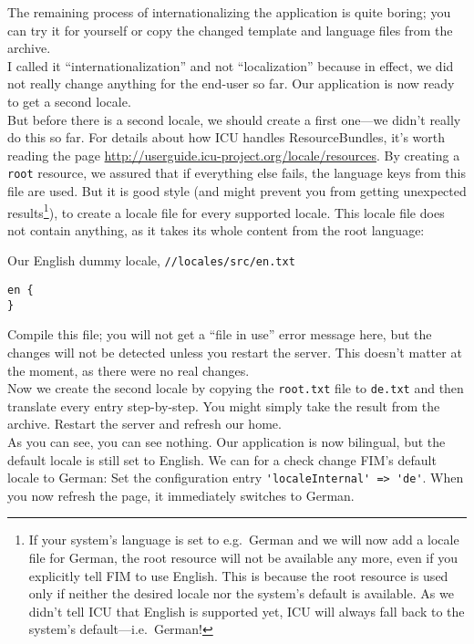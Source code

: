 \documentclass{scrartcl}
\begin{document}
      The remaining process of internationalizing the application is quite boring; you can try it for yourself or copy the changed template and language files from the archive. \\
      I called it ``internationalization'' and not ``localization'' because in effect, we did not really change anything for the end-user so far. Our application is now ready to get a second locale. \\
      But before there is a second locale, we should create a first one---we didn't really do this so far. For details about how ICU handles ResourceBundles, it's worth reading the page \url{http://userguide.icu-project.org/locale/resources}. By creating a \texttt{root} resource, we assured that if everything else fails, the language keys from this file are used. But it is good style (and might prevent you from getting unexpected results\footnote{If your system's language is set to e.g.\ German and we will now add a locale file for German, the root resource will not be available any more, even if you explicitly tell FIM to use English. This is because the root resource is used only if neither the desired locale nor the system's default is available. As we didn't tell ICU that English is supported yet, ICU will always fall back to the system's default---i.e.\ German!}), to create a locale file for every supported locale. This locale file does not contain anything, as it takes its whole content from the root language:
      \begin{listing}[H]
         \caption{Our English dummy locale, \texttt{//locales/src/en.txt}}
         \begin{verbatim}
en {
}
         \end{verbatim}
      \end{listing}
      Compile this file; you will not get a ``file in use'' error message here, but the changes will not be detected unless you restart the server. This doesn't matter at the moment, as there were no real changes. \\
      Now we create the second locale by copying the \texttt{root.txt} file to \texttt{de.txt} and then translate every entry step-by-step. You might simply take the result from the archive. Restart the server and refresh our home. \\
      As you can see, you can see nothing. Our application is now bilingual, but the default locale is still set to English. We can for a check change FIM's default locale to German: Set the configuration entry \lstinline!'localeInternal' => 'de'!. When you now refresh the page, it immediately switches to German. \\
\end{document}
